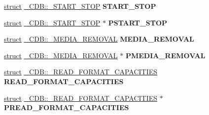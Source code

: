 \begin{DoxyCompactItemize}
\item 
\mbox{\label{union___c_d_b_ab312be4a736f5d627f7715eb59fdd8de}} 
\hyperlink{interfacestruct}{struct} \hyperlink{struct___c_d_b_1_1___s_t_a_r_t___s_t_o_p}{\+\_\+\+C\+D\+B\+::\+\_\+\+S\+T\+A\+R\+T\+\_\+\+S\+T\+OP} {\bfseries S\+T\+A\+R\+T\+\_\+\+S\+T\+OP}
\item 
\mbox{\label{union___c_d_b_ab39df17d93b06ececc0ea2df2098efd0}} 
\hyperlink{interfacestruct}{struct} \hyperlink{struct___c_d_b_1_1___s_t_a_r_t___s_t_o_p}{\+\_\+\+C\+D\+B\+::\+\_\+\+S\+T\+A\+R\+T\+\_\+\+S\+T\+OP} $\ast$ {\bfseries P\+S\+T\+A\+R\+T\+\_\+\+S\+T\+OP}
\item 
\mbox{\label{union___c_d_b_a060237060059832caca7c43949710459}} 
\hyperlink{interfacestruct}{struct} \hyperlink{struct___c_d_b_1_1___m_e_d_i_a___r_e_m_o_v_a_l}{\+\_\+\+C\+D\+B\+::\+\_\+\+M\+E\+D\+I\+A\+\_\+\+R\+E\+M\+O\+V\+AL} {\bfseries M\+E\+D\+I\+A\+\_\+\+R\+E\+M\+O\+V\+AL}
\item 
\mbox{\label{union___c_d_b_afcdb47183ed643802c1c507c1b4b82ee}} 
\hyperlink{interfacestruct}{struct} \hyperlink{struct___c_d_b_1_1___m_e_d_i_a___r_e_m_o_v_a_l}{\+\_\+\+C\+D\+B\+::\+\_\+\+M\+E\+D\+I\+A\+\_\+\+R\+E\+M\+O\+V\+AL} $\ast$ {\bfseries P\+M\+E\+D\+I\+A\+\_\+\+R\+E\+M\+O\+V\+AL}
\item 
\mbox{\label{union___c_d_b_a3bd30fd6779ffeced82665d90c76a3bf}} 
\hyperlink{interfacestruct}{struct} \hyperlink{struct___c_d_b_1_1___r_e_a_d___f_o_r_m_a_t___c_a_p_a_c_i_t_i_e_s}{\+\_\+\+C\+D\+B\+::\+\_\+\+R\+E\+A\+D\+\_\+\+F\+O\+R\+M\+A\+T\+\_\+\+C\+A\+P\+A\+C\+I\+T\+I\+ES} {\bfseries R\+E\+A\+D\+\_\+\+F\+O\+R\+M\+A\+T\+\_\+\+C\+A\+P\+A\+C\+I\+T\+I\+ES}
\item 
\mbox{\label{union___c_d_b_ab62273d089bb5ce7d798b8bcd0b76e5a}} 
\hyperlink{interfacestruct}{struct} \hyperlink{struct___c_d_b_1_1___r_e_a_d___f_o_r_m_a_t___c_a_p_a_c_i_t_i_e_s}{\+\_\+\+C\+D\+B\+::\+\_\+\+R\+E\+A\+D\+\_\+\+F\+O\+R\+M\+A\+T\+\_\+\+C\+A\+P\+A\+C\+I\+T\+I\+ES} $\ast$ {\bfseries P\+R\+E\+A\+D\+\_\+\+F\+O\+R\+M\+A\+T\+\_\+\+C\+A\+P\+A\+C\+I\+T\+I\+ES}
\item 
\mbox{\label{union___c_d_b_a7d5c622326fffb867f4044db1ea66dbf}} 

\end{DoxyCompactItemize}
